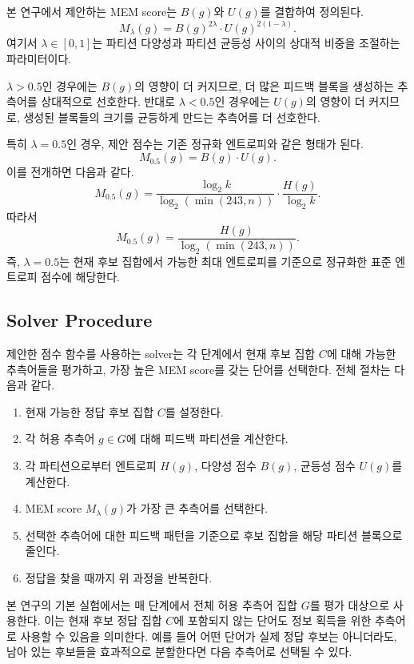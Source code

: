 \documentclass[11pt]{article}
\begin{document}
본 연구에서 제안하는 MEM score는 $B(g)$와 $U(g)$를 결합하여 정의된다.
\[
M_{\lambda}(g)
=
B(g)^{2\lambda}
\cdot
U(g)^{2(1-\lambda)}.
\]
여기서 $\lambda \in [0,1]$는 파티션 다양성과 파티션 균등성 사이의 상대적 비중을 조절하는 파라미터이다.

$\lambda > 0.5$인 경우에는 $B(g)$의 영향이 더 커지므로, 더 많은 피드백 블록을 생성하는 추측어를 상대적으로 선호한다.
반대로 $\lambda < 0.5$인 경우에는 $U(g)$의 영향이 더 커지므로, 생성된 블록들의 크기를 균등하게 만드는 추측어를 더 선호한다.

특히 $\lambda = 0.5$인 경우, 제안 점수는 기존 정규화 엔트로피와 같은 형태가 된다.
\[
M_{0.5}(g)
=
B(g) \cdot U(g).
\]
이를 전개하면 다음과 같다.
\[
M_{0.5}(g)
=
\frac{\log_2 k}{\log_2(\min(243,n))}
\cdot
\frac{H(g)}{\log_2 k}.
\]
따라서
\[
M_{0.5}(g)
=
\frac{H(g)}{\log_2(\min(243,n))}.
\]
즉, $\lambda = 0.5$는 현재 후보 집합에서 가능한 최대 엔트로피를 기준으로 정규화한 표준 엔트로피 점수에 해당한다.

\subsection{Solver Procedure}

제안한 점수 함수를 사용하는 solver는 각 단계에서 현재 후보 집합 $C$에 대해 가능한 추측어들을 평가하고, 가장 높은 MEM score를 갖는 단어를 선택한다.
전체 절차는 다음과 같다.

\begin{enumerate}
    \item 현재 가능한 정답 후보 집합 $C$를 설정한다.
    \item 각 허용 추측어 $g \in G$에 대해 피드백 파티션을 계산한다.
    \item 각 파티션으로부터 엔트로피 $H(g)$, 다양성 점수 $B(g)$, 균등성 점수 $U(g)$를 계산한다.
    \item MEM score $M_{\lambda}(g)$가 가장 큰 추측어를 선택한다.
    \item 선택한 추측어에 대한 피드백 패턴을 기준으로 후보 집합을 해당 파티션 블록으로 줄인다.
    \item 정답을 찾을 때까지 위 과정을 반복한다.
\end{enumerate}

본 연구의 기본 실험에서는 매 단계에서 전체 허용 추측어 집합 $G$를 평가 대상으로 사용한다.
이는 현재 후보 정답 집합 $C$에 포함되지 않는 단어도 정보 획득을 위한 추측어로 사용할 수 있음을 의미한다.
예를 들어 어떤 단어가 실제 정답 후보는 아니더라도, 남아 있는 후보들을 효과적으로 분할한다면 다음 추측어로 선택될 수 있다.
\end{document}
